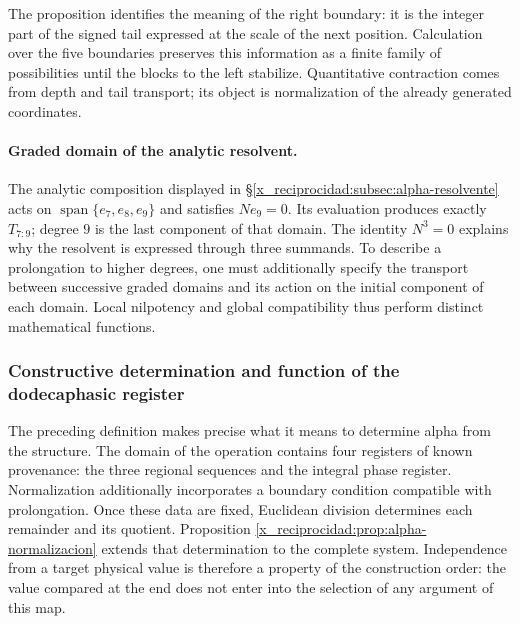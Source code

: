 The proposition identifies the meaning of the right boundary: it is the
integer part of the signed tail expressed at the scale of the next
position. Calculation over the five boundaries preserves this information
as a finite family of possibilities until the blocks to the
left stabilize. Quantitative contraction comes from
depth and tail transport; its object is normalization of
the already generated coordinates.

\paragraph{Graded domain of the analytic resolvent.}
\label{x_reciprocidad:ampl-alfa-dominio-resolvente}
The analytic composition displayed in
\S\ref{x_reciprocidad:subsec:alpha-resolvente} acts on
$\operatorname{span}\{e_7,e_8,e_9\}$ and satisfies $Ne_9=0$. Its
evaluation produces exactly $T_{7:9}$; degree $9$ is the last
component of that domain. The identity $N^3=0$ explains why the
resolvent is expressed through three summands. To describe a
prolongation to higher degrees, one must additionally specify the
transport between successive graded domains and its action on the
initial component of each domain. Local nilpotency and global
compatibility thus perform distinct mathematical functions.




\subsubsection{Constructive determination and function of the dodecaphasic register}
\label{x_reciprocidad:alpha-ampl-dependencias}

The preceding definition makes precise what it means to determine alpha from
the structure. The domain of the operation contains four registers of
known provenance: the three regional sequences and the integral phase
register. Normalization additionally incorporates a boundary condition
compatible with prolongation. Once these data are fixed, Euclidean
division determines each remainder and its quotient. Proposition
\ref{x_reciprocidad:prop:alpha-normalizacion} extends that determination to the complete
system. Independence from a target physical value is therefore
a property of the construction order: the value compared at the
end does not enter into the selection of any argument of this
map.

